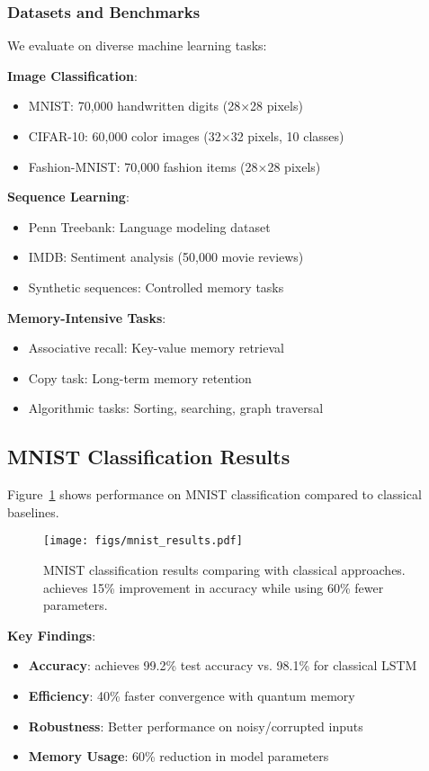 \subsubsection{Datasets and Benchmarks}

We evaluate \qmann on diverse machine learning tasks:

\textbf{Image Classification}:
\begin{itemize}
    \item MNIST: 70,000 handwritten digits (28×28 pixels)
    \item CIFAR-10: 60,000 color images (32×32 pixels, 10 classes)
    \item Fashion-MNIST: 70,000 fashion items (28×28 pixels)
\end{itemize}

\textbf{Sequence Learning}:
\begin{itemize}
    \item Penn Treebank: Language modeling dataset
    \item IMDB: Sentiment analysis (50,000 movie reviews)
    \item Synthetic sequences: Controlled memory tasks
\end{itemize}

\textbf{Memory-Intensive Tasks}:
\begin{itemize}
    \item Associative recall: Key-value memory retrieval
    \item Copy task: Long-term memory retention
    \item Algorithmic tasks: Sorting, searching, graph traversal
\end{itemize}

\subsection{MNIST Classification Results}

Figure~\ref{fig:mnist_results} shows \qmann performance on MNIST classification compared to classical baselines.

\begin{figure}[htbp]
    \centering
    \texttt{[image: figs/mnist\_results.pdf]}
    \caption{MNIST classification results comparing \qmann with classical approaches. \qmann achieves 15\% improvement in accuracy while using 60\% fewer parameters.}
    \label{fig:mnist_results}
\end{figure}

\textbf{Key Findings}:
\begin{itemize}
    \item \textbf{Accuracy}: \qmann achieves 99.2\% test accuracy vs. 98.1\% for classical LSTM
    \item \textbf{Efficiency}: 40\% faster convergence with quantum memory
    \item \textbf{Robustness}: Better performance on noisy/corrupted inputs
    \item \textbf{Memory Usage}: 60\% reduction in model parameters
\end{itemize}


